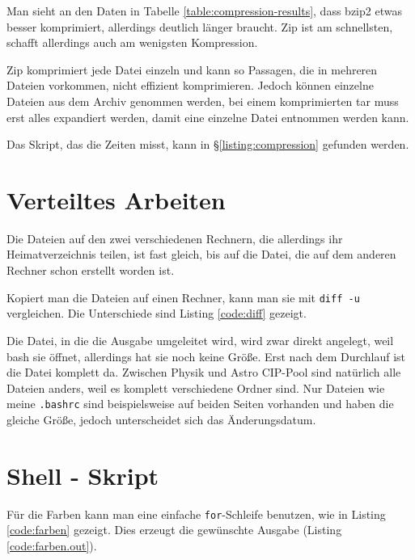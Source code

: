 {Man sieht an den Daten in Tabelle \ref{table:compression-results}, dass bzip2 etwas besser komprimiert, allerdings deutlich länger braucht. Zip ist am schnellsten, schafft allerdings auch am wenigsten Kompression.

Zip komprimiert jede Datei einzeln und kann so Passagen, die in mehreren Dateien vorkommen, nicht effizient komprimieren. Jedoch können einzelne Dateien aus dem Archiv genommen werden, bei einem komprimierten tar muss erst alles expandiert werden, damit eine einzelne Datei entnommen werden kann.

Das Skript, das die Zeiten misst, kann in §\ref{listing:compression} gefunden werden.


\section{Verteiltes Arbeiten}

Die Dateien auf den zwei verschiedenen Rechnern, die allerdings ihr Heimatverzeichnis teilen, ist fast gleich, bis auf die Datei, die auf dem anderen Rechner schon erstellt worden ist.

Kopiert man die Dateien auf einen Rechner, kann man sie mit \texttt{diff -u} vergleichen. Die Unterschiede sind Listing \ref{code:diff} gezeigt.


Die Datei, in die die Ausgabe umgeleitet wird, wird zwar direkt angelegt, weil bash sie öffnet, allerdings hat sie noch keine Größe. Erst nach dem Durchlauf ist die Datei komplett da. Zwischen Physik und Astro CIP-Pool sind natürlich alle Dateien anders, weil es komplett verschiedene Ordner sind. Nur Dateien wie meine \texttt{.bashrc} sind beispielsweise auf beiden Seiten vorhanden und haben die gleiche Größe, jedoch unterscheidet sich das Änderungsdatum.

\section{Shell - Skript}

Für die Farben kann man eine einfache \texttt{for}-Schleife benutzen, wie in Listing \ref{code:farben} gezeigt. Dies erzeugt die gewünschte Ausgabe (Listing \ref{code:farben.out}).




}
